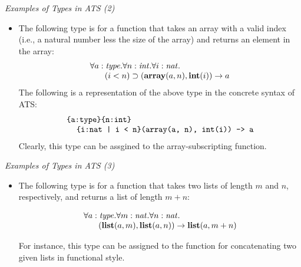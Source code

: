 \documentclass[pdf]{prosper}
\def\sint{{\it int}}
\def\snat{{\it nat}}
\def\stype{{\it type}}
\def\tint{\mbox{\bf int}}
\def\tlist{\mbox{\bf list}}
\def\tarray{\mbox{\bf array}}
\def\Bimp{\supset}
\def\timp{\rightarrow}
\begin{document}
\begin{slide}{\em Examples of Types in ATS (2)}
\begin{itemize}
\item

The following type is for a function that takes an array with a valid index
(i.e., a natural number less the size of the array) and returns an element
in the array:
$$\begin{array}{l}
\forall a:\stype.\forall n:\sint.\forall i:\snat.~\\
\kern18pt(i<n)\Bimp(\tarray(a, n), \tint(i)) \timp a \\
\end{array}$$
The following is a representation of the above type in the concrete syntax
of ATS:
$$\begin{array}{l}
\texttt{\{a:type\}\{n:int\}}\\
\kern12pt\texttt{\{i:nat | i < n\}(array(a, n), int(i)) -> a}\\
\end{array}$$
Clearly, this type can be assgined to the array-subscripting
function.

\end{itemize}
\end{slide}
\begin{slide}{\em Examples of Types in ATS (3)}
\begin{itemize}
\item

The following type is for a function that takes two lists of length $m$ and
$n$, respectively, and returns a list of length $m+n$:

$$\begin{array}{l}
\forall a:\stype.\forall m:\snat.\forall n:\snat.~\\
\kern18pt(\tlist(a, m), \tlist(a, n)) \timp \tlist(a, m+n)\\
\end{array}$$

For instance, this type can be assigned to the function for concatenating
two given lists in functional style.

\end{itemize}
\end{slide}
\end{document}
